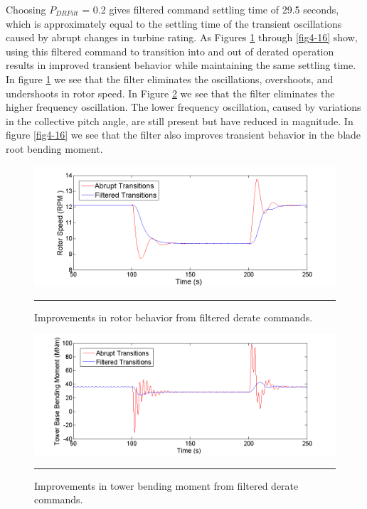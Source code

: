 Choosing $P_{DRFilt}$ = 0.2 gives filtered command settling time of 29.5 seconds, which is approximately equal to the settling time of the transient oscillations caused by abrupt changes in turbine rating. As Figures \ref{fig4-14} through \ref{fig4-16} show, using this filtered command to transition into and out of derated operation results in improved transient behavior while maintaining the same settling time. In figure \ref{fig4-14} we see that the filter eliminates the oscillations, overshoots, and undershoots in rotor speed. In Figure \ref{fig4-15} we see that the filter eliminates the higher frequency oscillation. The lower frequency oscillation, caused by variations in the collective pitch angle, are still present but have reduced in magnitude. In figure \ref{fig4-16} we see that the filter also improves transient behavior in the blade root bending moment.

\begin{figure}[htbp]
	\centering
		\includegraphics[trim = {1cm 0 2cm 0}, clip, width = \linewidth]{Figures/ch4Figures/fig4-14.png}
		\rule{35em}{0.5pt}
	\caption{Improvements in rotor behavior from filtered derate commands.}
	\label{fig4-14}
\end{figure}

\begin{figure}[htbp]
	\centering
		\includegraphics[trim = {1cm 0 2cm 0}, clip, width = \linewidth]{Figures/ch4Figures/fig4-15.png}
		\rule{35em}{0.5pt}
	\caption{Improvements in tower bending moment from filtered derate commands.}
	\label{fig4-15}
\end{figure}



